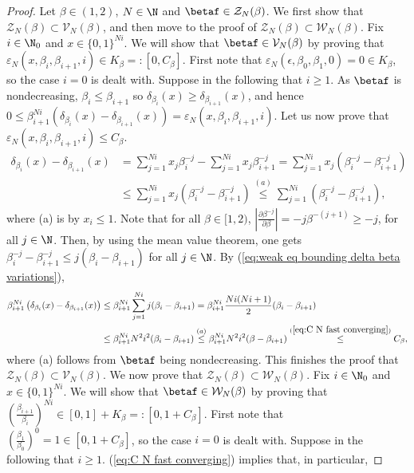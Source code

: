 \begin{proof} Let $\beta \in (1,2)$, $N \in \N$ and $\betaf \in \mathcal Z_N(\beta)$. We first show that $\mathcal Z_N(\beta) \subset \mathcal V_N(\beta)$, and then move to the proof of $\mathcal Z_N(\beta) \subset \mathcal W_N(\beta)$. Fix $i \in \N_0$ and $x \in \{0,1\}^{Ni}$. We will show that $\betaf \in \mathcal V_N(\beta)$ by proving that $\varepsilon_N(x, \beta_i, \beta_{i+1} , i) \in K_\beta =: [0, C_\beta]$. First note that $\varepsilon_N(\epsilon, \beta_0, \beta_{1} , 0) = 0 \in K_\beta$, so the case $i = 0$ is dealt with. Suppose in the following that $i \geq 1$. As $\betaf$ is nondecreasing, $\beta_i \leq \beta_{i+1}$ so $\delta_{\beta_i}(x) \geq \delta_{\beta_{i+1}}(x)$, and hence $0 \leq \beta_{i+1}^{Ni}\left(\delta_{\beta_i}(x) - \delta_{\beta_{i+1}}(x)\right) = \varepsilon_N(x, \beta_i, \beta_{i+1} , i)$. Let us now prove that $\varepsilon_N(x, \beta_i, \beta_{i+1} , i) \leq C_\beta$.
	\begin{align}
		\delta_{\beta_i}(x) - \delta_{\beta_{i+1}}(x) &= \sum_{j=1}^{Ni} x_j \beta_i^{-j} - \sum_{j=1}^{Ni} x_j \beta_{i+1}^{-j} = \sum_{j=1}^{Ni} x_j \left(\beta_i^{-j} -  \beta_{i+1}^{-j}\right)\\
		&\leq \sum_{j=1}^{Ni} x_j  \left(\beta_i^{-j} - \beta_{i+1}^{-j}\right) \overset{(a)}{\leq} \sum_{j=1}^{Ni}  \left(\beta_i^{-j} - \beta_{i+1}^{-j}\right), \label{eq:weak eq bounding delta beta variations}
	\end{align}
	where (a) is by $x_i \leq 1$.
	Note that for all $\beta \in [1,2)$, $\left|\frac{\partial \beta^{-j}}{\partial \beta}\right| = -j \beta^{-(j+1)} \geq -j$, for all $j \in \N$. Then, by using the mean value theorem, one gets $\beta_{i}^{-j} - \beta_{i+1}^{-j} \leq j (\beta_i - \beta_{i+1})$ for all $j \in \N$. By (\ref{eq:weak eq bounding delta beta variations}),
	\begin{align}
		\beta_{i+1}^{Ni}\left(\delta_{\beta_i}(x) - \delta_{\beta_{i+1}}(x)\right) &\leq \beta_{i+1}^{Ni} \sum_{j=1}^{Ni} j (\beta_i - \beta_{i+1}) = \beta_{i+1}^{Ni} \frac{Ni(Ni+1)}{2} (\beta_i - \beta_{i+1})\\
		&\leq \beta_{i+1}^{Ni} N^2i^2 (\beta_i - \beta_{i+1}) \overset{(a)}{\leq} \beta_{i+1}^{Ni} N^2i^2 (\beta - \beta_{i+1}) \overset{(\ref{eq:C N fast converging})}{\leq} C_\beta,
	\end{align}
	where (a) follows from $\betaf$ being nondecreasing. This finishes the proof that $\mathcal Z_N(\beta) \subset \mathcal V_N(\beta)$. We now prove that $\mathcal Z_N(\beta) \subset \mathcal W_N(\beta)$. Fix $i \in \N_0$ and $x \in \{0,1\}^{Ni}$. We will show that $\betaf \in \mathcal W_N(\beta)$ by proving that $\left(\frac{\beta_{i+1}}{\beta_{i}}\right)^{Ni} \in [0,1] + K_\beta =: [0, 1+ C_\beta]$. First note that $\left(\frac{\beta_{1}}{\beta_{0}}\right)^{0} = 1 \in [0, 1+ C_\beta]$, so the case $i = 0$ is dealt with. Suppose in the following that $i \geq 1$. (\ref{eq:C N fast converging}) implies that, in particular,

\end{proof}
